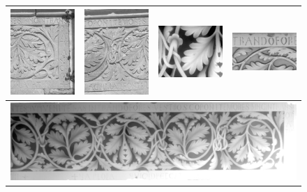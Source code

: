 \begin{figure}
\begin{tabular}{||c|c|c|c||}
   \hline \hline
   \includegraphics[width=40mm]{FIGS/SAMPLES/FRISE-IM1.jpg} &
   \includegraphics[width=40mm]{FIGS/SAMPLES/FRISE-IM2.jpg} &
   \includegraphics[width=40mm]{FIGS/SAMPLES/FRISE-Det1-F8Bits.jpg}&
   \includegraphics[width=40mm]{FIGS/SAMPLES/FRISE-Detail-ScaledShade.jpg} \\ \hline  \hline
   \multicolumn{4}{|c|}{\vspace{2mm} \includegraphics[width=160mm]{FIGS/SAMPLES/FriseDepthBits.jpg}} \\ \hline  \hline

\end{tabular}
\end{figure}
